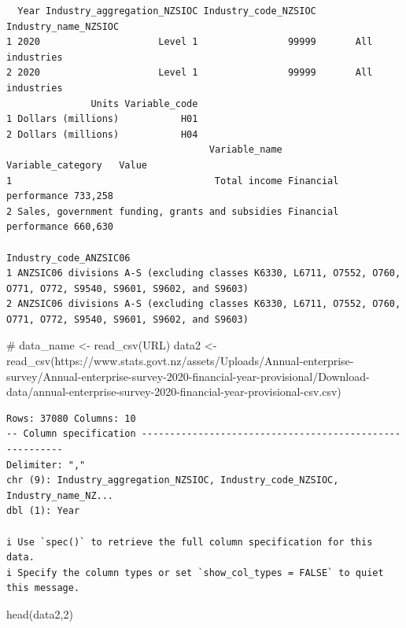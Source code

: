 \documentclass[
  letterpaper,
  DIV=11,
  numbers=noendperiod]{scrreprt}
\newenvironment{Shaded}{\begin{snugshade}}{\end{snugshade}}
\newcommand{\CommentTok}[1]{\textcolor[rgb]{0.37,0.37,0.37}{#1}}
\newcommand{\DecValTok}[1]{\textcolor[rgb]{0.68,0.00,0.00}{#1}}
\newcommand{\FunctionTok}[1]{\textcolor[rgb]{0.28,0.35,0.67}{#1}}
\newcommand{\NormalTok}[1]{\textcolor[rgb]{0.00,0.23,0.31}{#1}}
\newcommand{\OtherTok}[1]{\textcolor[rgb]{0.00,0.23,0.31}{#1}}
\newcommand{\StringTok}[1]{\textcolor[rgb]{0.13,0.47,0.30}{#1}}
\begin{document}
\begin{verbatim}
  Year Industry_aggregation_NZSIOC Industry_code_NZSIOC Industry_name_NZSIOC
1 2020                     Level 1                99999       All industries
2 2020                     Level 1                99999       All industries
               Units Variable_code
1 Dollars (millions)           H01
2 Dollars (millions)           H04
                                    Variable_name     Variable_category   Value
1                                    Total income Financial performance 733,258
2 Sales, government funding, grants and subsidies Financial performance 660,630
                                                                                            Industry_code_ANZSIC06
1 ANZSIC06 divisions A-S (excluding classes K6330, L6711, O7552, O760, O771, O772, S9540, S9601, S9602, and S9603)
2 ANZSIC06 divisions A-S (excluding classes K6330, L6711, O7552, O760, O771, O772, S9540, S9601, S9602, and S9603)
\end{verbatim}

\begin{Shaded}
\begin{Highlighting}[]
\CommentTok{\# data\_name \textless{}{-} read\_csv(\textquotesingle{}URL\textquotesingle{})}
\NormalTok{data2 }\OtherTok{\textless{}{-}} \FunctionTok{read\_csv}\NormalTok{(}\StringTok{\textquotesingle{}https://www.stats.govt.nz/assets/Uploads/Annual{-}enterprise{-}survey/Annual{-}enterprise{-}survey{-}2020{-}financial{-}year{-}provisional/Download{-}data/annual{-}enterprise{-}survey{-}2020{-}financial{-}year{-}provisional{-}csv.csv\textquotesingle{}}\NormalTok{)}
\end{Highlighting}
\end{Shaded}

\begin{verbatim}
Rows: 37080 Columns: 10
-- Column specification --------------------------------------------------------
Delimiter: ","
chr (9): Industry_aggregation_NZSIOC, Industry_code_NZSIOC, Industry_name_NZ...
dbl (1): Year

i Use `spec()` to retrieve the full column specification for this data.
i Specify the column types or set `show_col_types = FALSE` to quiet this message.
\end{verbatim}

\begin{Shaded}
\begin{Highlighting}[]
\FunctionTok{head}\NormalTok{(data2,}\DecValTok{2}\NormalTok{)}
\end{Highlighting}
\end{Shaded}
\end{document}

